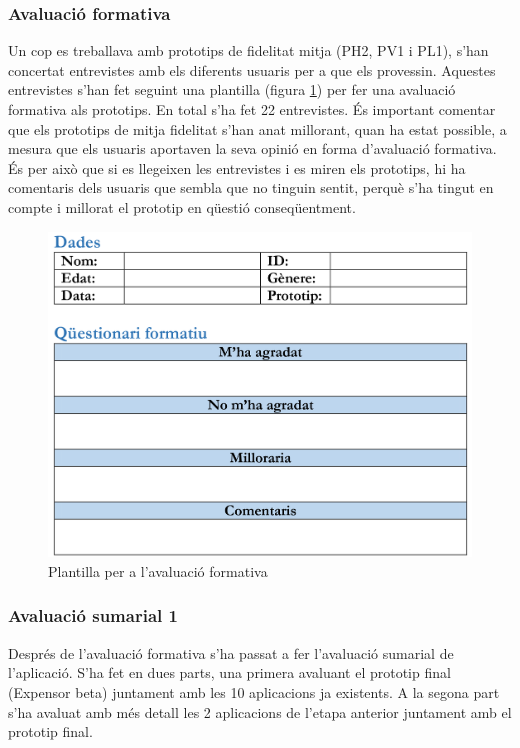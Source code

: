 \subsubsection{Avaluació formativa}
Un cop es treballava amb prototips de fidelitat mitja (PH2, PV1 i PL1), s'han concertat entrevistes amb els diferents usuaris per a que els provessin. Aquestes entrevistes s'han fet seguint una plantilla (figura \ref{fig:qf}) per fer una avaluació formativa als prototips. En total s'ha fet 22 entrevistes. %
És important comentar que els prototips de mitja fidelitat s'han anat millorant, quan ha estat possible, a mesura que els usuaris aportaven la seva opinió en forma d'avaluació formativa. És per això que si es llegeixen les entrevistes i es miren els prototips, hi ha comentaris dels usuaris que sembla que no tinguin sentit, perquè s'ha tingut en compte i millorat el prototip en qüestió conseqüentment. 

\begin{figure}[htp]
\centering
\includegraphics[scale=1]{qf.png}
\caption{Plantilla per a l'avaluació formativa}\label{fig:qf}
\end{figure}

\subsubsection{Avaluació sumarial 1}
Després de l'avaluació formativa s'ha passat a fer l'avaluació sumarial de l'aplicació. S'ha fet en dues parts, una primera avaluant  el prototip final (Expensor beta) juntament amb les 10 aplicacions ja existents. A la segona part s'ha avaluat amb més detall les 2 aplicacions de l'etapa anterior juntament amb el prototip final.


